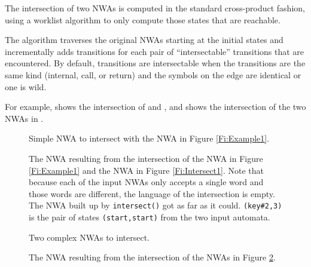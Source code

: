 The intersection of two NWAs is computed in the standard cross-product
fashion, using a worklist algorithm to only compute those states that
are reachable.

The algorithm traverses the original NWAs starting at
the initial states and incrementally adds transitions for each pair of
``intersectable'' transitions that are encountered. By default, transitions
are intersectable when the transitions are the same kind (internal, call,
or return) and the symbols on the edge are identical or one is wild.

For example,  shows the intersection of  and
, and  shows the intersection of the
two NWAs in .

 
\begin{figure}[tp]
  \centering
  \begin{minipage}{0.48\textwidth}
    \centering
    \caption{Simple NWA to intersect with the NWA in Figure \ref{Fi:Example1}.}
    \label{Fi:Intersect1}
  \end{minipage}\hspace{0.2cm}
  \begin{minipage}{0.49\textwidth}
    \centering
    \caption{The NWA resulting from the intersection of the NWA in Figure
      \ref{Fi:Example1} and the NWA in Figure \ref{Fi:Intersect1}. Note that
      because each of the input NWAs only accepts a single word and those
      words are different, the language of the intersection is empty. The NWA
    built up by \texttt{intersect()} got as far as it
    could. \texttt{(key\#2,3)} is the pair of states \texttt{(start,start)}
    from the two input automata.}
    \label{Fi:Intersect2}
  \end{minipage}
\end{figure}

\begin{figure}[p]
  \centering
  \caption{Two complex NWAs to intersect.}
  \label{Fi:Intersect3}
\end{figure}

\begin{figure}[p]
  \centering
  \caption{The NWA resulting from the intersection of the NWAs in Figure \ref{Fi:Intersect3}.}
  \label{Fi:Intersect4}
\end{figure}

